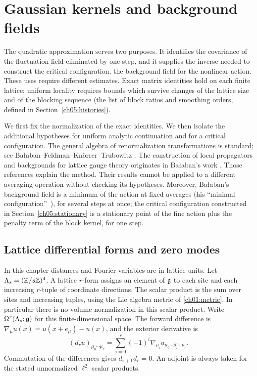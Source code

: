 \chapter{Gaussian kernels and background fields}
\label{ch05:gaussian}

The quadratic approximation serves two purposes. It identifies the
covariance of the fluctuation field eliminated by one step, and
it supplies the inverse needed to construct the critical configuration, the background field for
the nonlinear action. These uses require different estimates. Exact matrix
identities hold on each finite lattice; uniform locality requires bounds
which survive changes of the lattice size and of the blocking sequence (the list of block ratios and smoothing orders, defined in Section~\ref{ch05:histories}).

We first fix the normalization of the exact identities. We then isolate the
additional hypotheses for uniform analytic continuation and for a
critical configuration. The general algebra of renormalization transformations is
standard; see Ba{\l}aban--Feldman--Kn\"orrer--Trubowitz
\cite{BalabanFeldmanKnoerrerTrubowitz2016}. The construction of local
propagators and backgrounds for lattice gauge theory originates in
Ba{\l}aban's work \cite{Balaban1984Propagators,Balaban1985Variational}.
Those references explain the method. Their results cannot be applied to a
different averaging operation without checking its hypotheses. Moreover, Ba{\l}aban's background field is a minimum of the action at fixed averages (his ``minimal configuration''~\cite{Balaban1985Variational}), for several steps at once; the critical configuration constructed in Section~\ref{ch05:stationary} is a stationary point of the fine action plus the penalty term of the block kernel, for one step.

\section{Lattice differential forms and zero modes}
\label{ch05:forms}

In this chapter distances and Fourier variables are in lattice units.
Let $\Lambda_s=(\mathbb Z/s\mathbb Z)^4$. A lattice $r$-form assigns an element of
$\mathfrak g$ to each site and each increasing $r$-tuple of coordinate
directions. The scalar product is the sum over sites and increasing
tuples, using the Lie algebra metric of \eqref{ch01:metric}.
In particular there is no volume normalization in this scalar product.
Write $\Omega^r(\Lambda_s;\mathfrak g)$ for this finite-dimensional space.
The forward difference is
$\nabla_\mu u(x)=u(x+e_\mu)-u(x)$, and the exterior derivative is
\[
 (d_r u)_{\mu_0\cdots\mu_r}
 =\sum_{i=0}^r(-1)^i\nabla_{\mu_i}
       u_{\mu_0\cdots\widehat{\mu_i}\cdots\mu_r}.
\]
Commutation of the differences gives $d_{r+1}d_r=0$.
An adjoint is always taken for the stated unnormalized $\ell^2$ scalar products.

